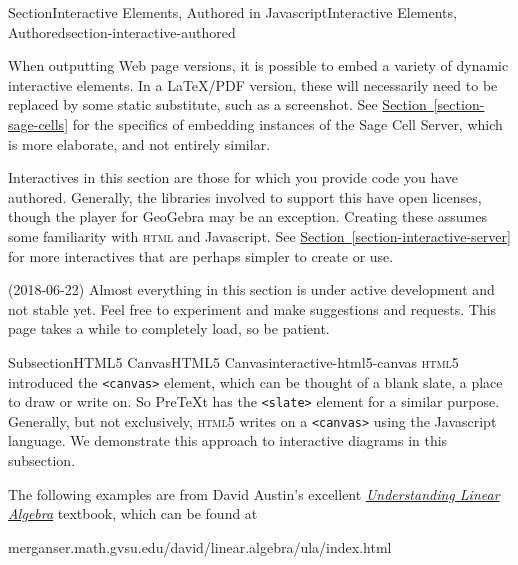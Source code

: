 \documentclass[twoside,10pt,]{article}
\newcommand{\xreffont}{\relax}
\newcommand{\mono}[1]{\texttt{#1}}
\newcommand{\initialism}[1]{\textsc{\MakeLowercase{#1}}}
\newcommand{\pubtitle}[1]{\textsl{#1}}
\numberwithin{equation}{section}
\begin{document}
\begin{sectionptx}{Section}{Interactive Elements, Authored in Javascript}{}{Interactive Elements, Authored}{}{}{section-interactive-authored}
%
%
\begin{introduction}{}%
When outputting Web page versions, it is possible to embed a variety of dynamic interactive elements.  In a \LaTeX{}\slash{}PDF version, these will necessarily need to be replaced by some static substitute, such as a screenshot.  See \hyperref[section-sage-cells]{Section~{\xreffont\ref{section-sage-cells}}} for the specifics of embedding instances of the Sage Cell Server, which is more elaborate, and not entirely similar.%
\par
Interactives in this section are those for which you provide code you have authored.  Generally, the libraries involved to support this have open licenses, though the player for GeoGebra may be an exception.  Creating these assumes some familiarity with \initialism{HTML} and Javascript.  See \hyperref[section-interactive-server]{Section~{\xreffont\ref{section-interactive-server}}} for more interactives that are perhaps simpler to create or use.%
\par
(2018-06-22) Almost everything in this section is under active development and not stable yet.  Feel free to experiment and make suggestions and requests.  This page takes a while to completely load, so be patient.%
\end{introduction}%
%
%
\typeout{************************************************}
\typeout{************************************************}
%
\begin{subsectionptx}{Subsection}{HTML5 Canvas}{}{HTML5 Canvas}{}{}{interactive-html5-canvas}
\initialism{HTML5} introduced the \mono{<canvas>} element, which can be thought of a blank slate, a place to draw or write on.  So PreTeXt has the \mono{<slate>} element for a similar purpose.  Generally, but not exclusively, \initialism{HTML5} writes on a \mono{<canvas>} using the Javascript language.  We demonstrate this approach to interactive diagrams in this subsection.%
\par
The following examples are from David Austin's excellent \href{http://merganser.math.gvsu.edu/david/linear.algebra/ula/index.html}{\pubtitle{Understanding Linear Algebra}} textbook, which can be found at%
\begin{codedisplay}
merganser.math.gvsu.edu/david/linear.algebra/ula/index.html

\end{codedisplay}
\end{subsectionptx}
\end{sectionptx}
\end{document}
